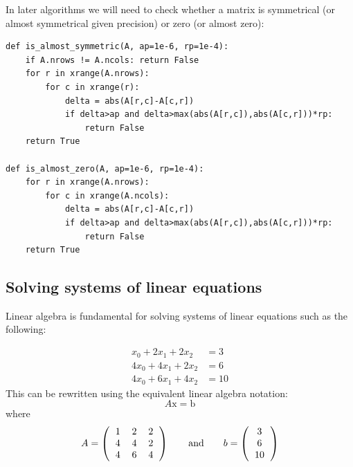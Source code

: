 \documentclass[justified,sixbynine]{tufte-book}
\def\ft{\small\tt}
\theoremstyle{plain}%
\theoremstyle{definition}
\theoremstyle{remark}
\begin{document}
\begin{fullwidth}

In later algorithms we will need to check whether a matrix is symmetrical (or almost symmetrical given precision) or zero (or almost zero):

\begin{lstlisting}[caption={in file: {\ft nlib.py}}]
def is_almost_symmetric(A, ap=1e-6, rp=1e-4):
    if A.nrows != A.ncols: return False
    for r in xrange(A.nrows):
        for c in xrange(r):
            delta = abs(A[r,c]-A[c,r])
            if delta>ap and delta>max(abs(A[r,c]),abs(A[c,r]))*rp:
                return False
    return True

def is_almost_zero(A, ap=1e-6, rp=1e-4):
    for r in xrange(A.nrows):
        for c in xrange(A.ncols):
            delta = abs(A[r,c]-A[c,r])
            if delta>ap and delta>max(abs(A[r,c]),abs(A[c,r]))*rp:
                return False
    return True
\end{lstlisting}

\goodbreak\subsection{Solving systems of linear equations}


Linear algebra is fundamental for solving systems of linear equations such as the following:

\begin{align}
x_0+2x_1+2x_2 &=3 \\
4x_0+4x_1+2x_2&=6 \\
4x_0+6x_1+4x_2&=10
\end{align}
This can be rewritten using the equivalent linear algebra notation:
\begin{equation}
A \textrm{x} = \textrm{b}
\end{equation}
where
\begin{equation}
A = \left(\begin{tabular}{ccc}
1 & 2 & 2 \\
4 & 4 & 2 \\
4 & 6 & 4 \\
\end{tabular}\right) \qquad \text{and} \qquad
b =
\left(\begin{tabular}{c}
3 \\
6 \\
10 \\
\end{tabular}\right)
\end{equation}


\end{fullwidth}
\end{document}
